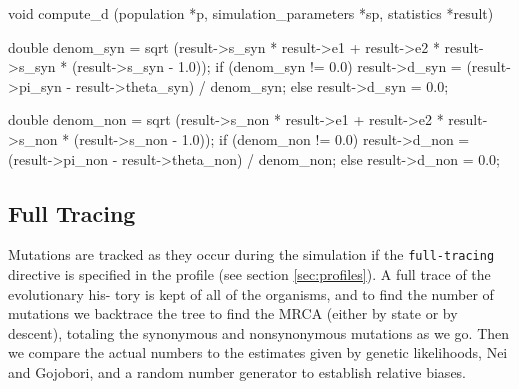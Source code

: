 \documentclass{article}
\begin{document}
\begin{ccode}
void compute_d (population *p, simulation_parameters *sp, statistics *result) {
  double denom_syn = sqrt (result->s_syn * result->e1 + result->e2 * result->s_syn *
							(result->s_syn - 1.0));
  if (denom_syn != 0.0)
    result->d_syn = (result->pi_syn - result->theta_syn) / denom_syn;
  else
    result->d_syn = 0.0;

  double denom_non = sqrt (result->s_non * result->e1 + result->e2 * result->s_non *
							(result->s_non - 1.0));
  if (denom_non != 0.0)
    result->d_non = (result->pi_non - result->theta_non) / denom_non;
  else
    result->d_non = 0.0;
}
\end{ccode}

    \subsection{Full Tracing}
      \label{sec:full-tracing}

      Mutations are tracked as they occur during the simulation if the
      \verb|full-tracing| directive is specified in the profile (see section
	  \ref{sec:profiles}). A full trace of the evolutionary his- tory is
      kept of all of the organisms, and to find the number of mutations we
      backtrace the tree to find the MRCA (either by state or by descent),
      totaling the synonymous and nonsynonymous mutations as we go. Then we
      compare the actual numbers to the estimates given by genetic likelihoods,
      Nei and Gojobori, and a random number generator to establish relative
      biases.
\end{document}
